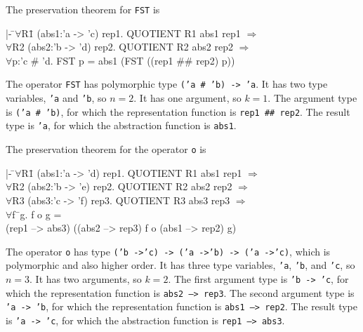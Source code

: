 \documentclass[envcountsame,runningheads]{llncs}
\begin{document}
The preservation theorem for {\tt FST} is
{\tt \begin{tabbing}
\hspace{5.5mm}
    |- \=$\forall$R\=1 (abs1:'a -> 'c) rep1. QUOTIENT R1 abs1 rep1 $\Rightarrow$ \\
\>     $\forall$R2 (abs2:'b -> 'd) rep2. QUOTIENT R2 abs2 rep2 $\Rightarrow$ \\
\>\>     $\forall$p:'c \# 'd. FST p = abs1 (FST ((rep1 \#\# rep2) p))
\end{tabbing}}
The operator {\tt FST} has polymorphic type {\tt ('a \# 'b) -> 'a}. 
It has two type variables, {\tt 'a} and {\tt 'b}, so $n = 2$. 
It has one argument, so $k = 1$.
The argument type is
{\tt ('a \# 'b)},
for which
the representation function
is {\tt rep1 \#\# rep2}.
The result type is
{\tt 'a},
for which
the abstraction function
is {\tt abs1}.

\pagebreak[3]
The preservation theorem for the operator {\tt o} is
{\tt \begin{tabbing}
\hspace{5.5mm}
    |- \=$\forall$R\=1 (abs1:'a -> 'd) rep1. QUOTIENT R1 abs1 rep1 $\Rightarrow$ \\
\>     $\forall$R2 (abs2:'b -> 'e) rep2. QUOTIENT R2 abs2 rep2 $\Rightarrow$ \\
\>     $\forall$R3 (abs3:'c -> 'f) rep3. QUOTIENT R3 abs3 rep3 $\Rightarrow$ \\
\>\>     $\forall$f\=\ g. f o g = \\
\>\>\>     (rep1 --> abs3) ((abs2 --> rep3) f o (abs1 --> rep2) g)
\end{tabbing}}
The operator {\tt o} has type
{\tt ('b ->\;'c) -> ('a ->\;'b) -> ('a ->\;'c)},
which is polymorphic and also higher order.
It has three type variables, {\tt 'a}, {\tt 'b}, and {\tt 'c}, so $n = 3$. 
It has two arguments, so $k = 2$.
The first argument type is
{\tt 'b -> 'c},
for which
the representation function
is {\tt abs2 --> rep3}.
The second argument type is
{\tt 'a -> 'b},
for which
the representation function
is {\tt abs1 --> rep2}.
The result type is
{\tt 'a -> 'c},
for which
the abstraction function
is {\tt rep1 --> abs3}.
\end{document}
